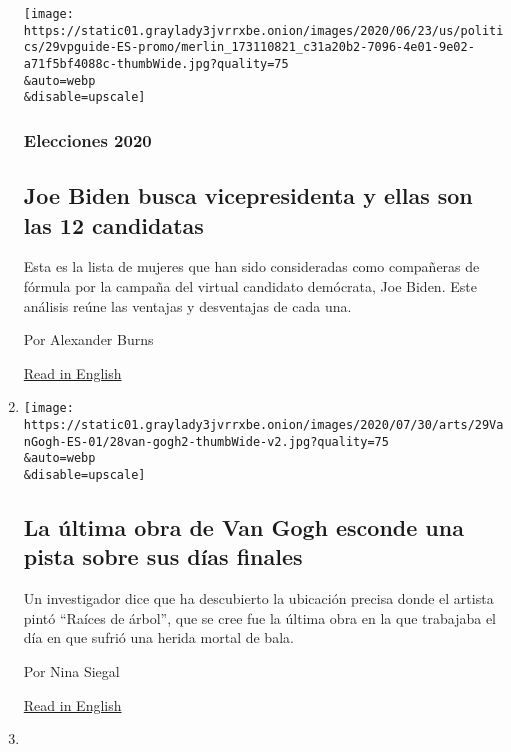 \begin{enumerate}
  \texttt{[image: https://static01.graylady3jvrrxbe.onion/images/2020/06/23/us/politics/29vpguide-ES-promo/merlin\_173110821\_c31a20b2-7096-4e01-9e02-a71f5bf4088c-thumbWide.jpg?quality=75\\\&auto=webp\\\&disable=upscale]}

  \hypertarget{elecciones-2020-1}{%
  \subsubsection{Elecciones 2020}\label{elecciones-2020-1}}

  \hypertarget{joe-biden-busca-vicepresidenta-y-ellas-son-las-12-candidatas}{%
  \subsection{Joe Biden busca vicepresidenta y ellas son las 12
  candidatas}\label{joe-biden-busca-vicepresidenta-y-ellas-son-las-12-candidatas}}

  Esta es la lista de mujeres que han sido consideradas como compañeras
  de fórmula por la campaña del virtual candidato demócrata, Joe Biden.
  Este análisis reúne las ventajas y desventajas de cada una.

  Por Alexander Burns

  \href{https://www.nytimes3xbfgragh.onion/article/biden-vice-president-2020.html}{Read
  in English}
\item
  \href{/es/2020/07/29/espanol/cultura/vincent-van-gogh-raices-arbol.html}{}

  \texttt{[image: https://static01.graylady3jvrrxbe.onion/images/2020/07/30/arts/29VanGogh-ES-01/28van-gogh2-thumbWide-v2.jpg?quality=75\\\&auto=webp\\\&disable=upscale]}

  \hypertarget{la-uxfaltima-obra-de-van-gogh-esconde-una-pista-sobre-sus-duxedas-finales}{%
  \subsection{La última obra de Van Gogh esconde una pista sobre sus
  días
  finales}\label{la-uxfaltima-obra-de-van-gogh-esconde-una-pista-sobre-sus-duxedas-finales}}

  Un investigador dice que ha descubierto la ubicación precisa donde el
  artista pintó ``Raíces de árbol'', que se cree fue la última obra en
  la que trabajaba el día en que sufrió una herida mortal de bala.

  Por Nina Siegal

  \href{https://www.nytimes3xbfgragh.onion/2020/07/28/arts/design/vincent-van-gogh-tree-roots.html}{Read
  in English}
\item
  \href{/es/2020/07/29/espanol/america-latina/democracia-america-latina-pandemia.html}{}


\end{enumerate}
